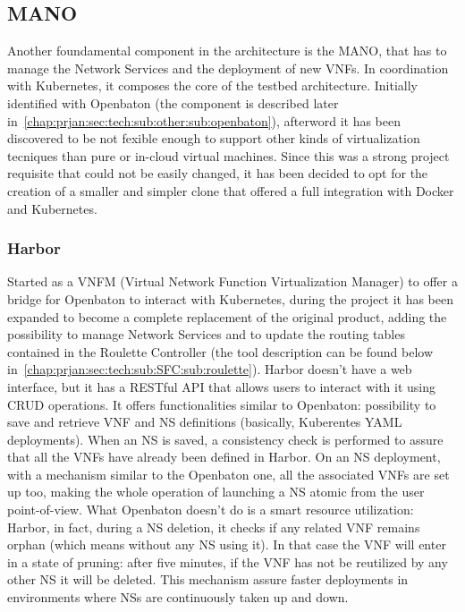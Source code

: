 \vspace{0.5cm}


\subsection{MANO}

Another foundamental component in the architecture is the MANO, that has to 
manage the Network Services and the deployment of new VNFs. In coordination 
with Kubernetes, it composes the core of the testbed architecture. Initially 
identified with Openbaton (the component is described later 
in~\ref{chap:prjan:sec:tech:sub:other:sub:openbaton}), afterword it has been 
discovered to be not fexible enough to support other kinds of virtualization 
tecniques than pure or in-cloud virtual machines. 
Since this was a strong project requisite that could not be easily changed, it 
has been decided to opt for the creation of a smaller and simpler clone that 
offered a full integration with Docker and Kubernetes.

\subsubsection{Harbor}
\label{chap:prjan:sec:tech:sub:MANO:sub:harbor}
Started as a VNFM (Virtual Network Function Virtualization Manager) to offer a
bridge for Openbaton to interact with Kubernetes, during the project it has been
expanded to become a complete replacement of the original product, adding the
possibility to manage Network Services and to update the routing tables
contained in the Roulette Controller (the tool description can be found below
in~\ref{chap:prjan:sec:tech:sub:SFC:sub:roulette}). Harbor doesn't have a web
interface, but it has a RESTful API that allows users to interact with it using
CRUD operations. It offers functionalities similar to Openbaton: possibility to
save and retrieve VNF and NS definitions (basically, Kuberentes YAML
deployments). When an NS is saved, a consistency check is performed to assure
that all the VNFs have already been defined in Harbor. On an NS deployment, with
a mechanism similar to the Openbaton one, all the associated VNFs are set up
too, making the whole operation of launching a NS atomic from the user
point-of-view. What Openbaton doesn't do is a smart resource utilization:
Harbor, in fact, during a NS deletion, it checks if any related VNF remains
orphan (which means without any NS using it). In that case the VNF will enter in
a state of pruning: after five minutes, if the VNF has not be reutilized by any
other NS it will be deleted. This mechanism assure faster deployments in
environments where NSs are continuously taken up and down. 

